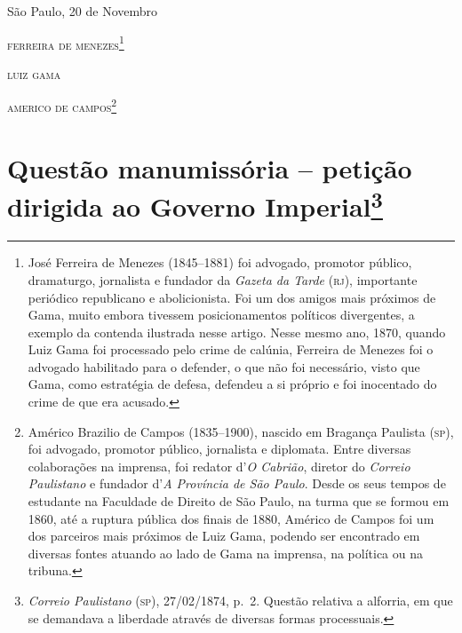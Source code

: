 \begin{flushright}
São Paulo, 20 de Novembro

\textsc{ferreira de menezes}\footnote{ José Ferreira de Menezes (1845--1881) foi
  advogado, promotor público, dramaturgo, jornalista e fundador da
  \emph{Gazeta da Tarde} (\textsc{rj}), importante periódico republicano e
  abolicionista. Foi um dos amigos mais próximos de Gama, muito embora
  tivessem posicionamentos políticos divergentes, a exemplo da contenda
  ilustrada nesse artigo. Nesse mesmo ano, 1870, quando Luiz Gama foi
  processado pelo crime de calúnia, Ferreira de Menezes foi o advogado
  habilitado para o defender, o que não foi necessário, visto que Gama,
  como estratégia de defesa, defendeu a si próprio e foi inocentado do
  crime de que era acusado.}

\textsc{luiz gama}

\textsc{americo de campos}\footnote{ Américo Brazilio de Campos (1835--1900),
  nascido em Bragança Paulista (\textsc{sp}), foi advogado, promotor público,
  jornalista e diplomata. Entre diversas colaborações na imprensa, foi
  redator d'\emph{O Cabrião}, diretor do \emph{Correio Paulistano} e
  fundador d'\emph{A Província de São Paulo}. Desde os seus tempos de
  estudante na Faculdade de Direito de São Paulo, na turma que se formou
  em 1860, até a ruptura pública dos finais de 1880, Américo de Campos
  foi um dos parceiros mais próximos de Luiz Gama, podendo ser
  encontrado em diversas fontes atuando ao lado de Gama na imprensa, na
  política ou na tribuna.}
\end{flushright}

\chapter{Questão manumissória -- petição dirigida ao Governo
Imperial\footnote{\emph{Correio Paulistano} (\textsc{sp}), 27/02/1874, p.~2.
  Questão relativa a alforria, em que se demandava a liberdade através
  de diversas formas processuais.}} %

